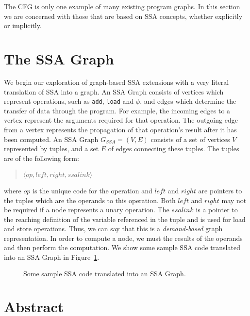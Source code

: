 The CFG is only one example of many existing program graphs. In this section we are concerned with those that are based on SSA concepts, whether explicitly or implicitly.

\section{The SSA Graph}

We begin our exploration of graph-based SSA extensions with a very literal translation of SSA into a graph. An SSA Graph consists of vertices which represent operations, such as \texttt{add}, \texttt{load} and $\mathtt{\phi}$, and edges which determine the transfer of data through the program. For example, the incoming edges to a vertex represent the arguments required for that operation. The outgoing edge from a vertex represents the propagation of that operation's result after it has been computed. An SSA Graph $G_{SSA}=(V,E)$ consists of a set of vertices $V$ represented by tuples, and a set $E$ of edges connecting these tuples. The tuples are of the following form: 

\begin{quote}
\centering
$\langle op,left,right,ssalink\rangle$
\end{quote}

where $op$ is the unique code for the operation and $left$ and $right$ are pointers to the tuples which are the operands to this operation. Both $left$ and $right$ may not be required if a node represents a unary operation. The $ssalink$ is a pointer to the reaching definition of the variable referenced in the tuple and is used for load and store operations. Thus, we can say that this is a \textit{demand-based} graph representation. In order to compute a node, we must  the results of the operands and then perform the computation. We show some sample SSA code translated into an SSA Graph in Figure~\ref{fig: simple-ssa-graph}.

\begin{figure}
\label{fig: simple-ssa-graph}
\caption{Some sample SSA code translated into an SSA Graph.}
\end{figure}


\section*{Abstract}

